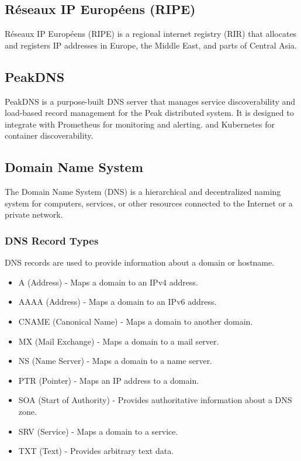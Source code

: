 \documentclass[12pt]{article}
\begin{document}
\subsection{Réseaux IP Européens (RIPE)}
Réseaux IP Européens (RIPE)\cite{WelcomeRIPERIPE2024} is a regional internet registry (RIR) 
that allocates and registers IP addresses in Europe, the Middle East, and parts of Central Asia.

\subsection{PeakDNS}
PeakDNS\cite{heimonenPeakDNS2024} is a purpose-built DNS server that manages service discoverability and 
load-based record management for the Peak distributed system.
It is designed to integrate with Prometheus for monitoring and alerting.
and Kubernetes for container discoverability.

\subsection{Domain Name System}
The Domain Name System (DNS)\cite{DomainNamesImplementation1987} is a hierarchical and decentralized naming system for computers, 
services, or other resources connected to the Internet or a private network.
\subsubsection{DNS Record Types}
DNS records are used to provide information about a domain or hostname.
\begin{itemize}
    \item A (Address) - Maps a domain to an IPv4 address.
    \item AAAA (Address) - Maps a domain to an IPv6 address.
    \item CNAME (Canonical Name) - Maps a domain to another domain.
    \item MX (Mail Exchange) - Maps a domain to a mail server.
    \item NS (Name Server) - Maps a domain to a name server.
    \item PTR (Pointer) - Maps an IP address to a domain.
    \item SOA (Start of Authority) - Provides authoritative information about a DNS zone.
    \item SRV (Service) - Maps a domain to a service.
    \item TXT (Text) - Provides arbitrary text data.
\end{itemize}
\end{document}
